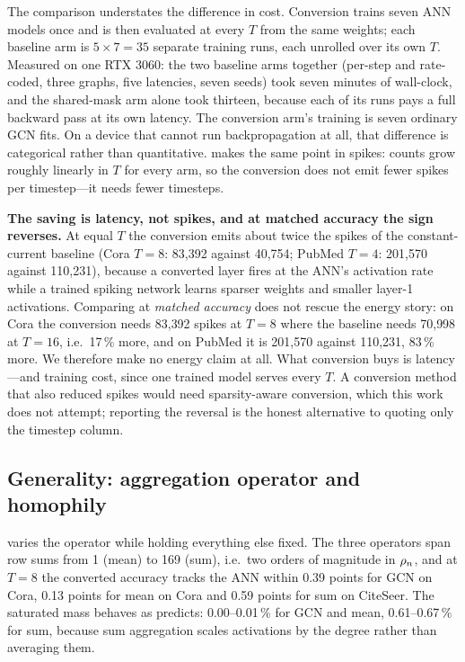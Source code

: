 The comparison understates the difference in cost. Conversion trains seven ANN models once and is
then evaluated at every $T$ from the same weights; each baseline arm is $5 \times 7 = 35$ separate
training runs, each unrolled over its own $T$. Measured on one RTX 3060: the two baseline arms
together (per-step and rate-coded, three graphs, five latencies, seven seeds) took seven minutes of
wall-clock, and the shared-mask arm alone took thirteen, because each of its runs pays a full
backward pass at its own latency. The conversion arm's training is seven ordinary GCN fits. On a
device that cannot run backpropagation at all, that difference is categorical rather than
quantitative.  makes the same point in spikes:
counts grow roughly linearly in $T$ for every arm, so the conversion does not emit fewer spikes per
timestep---it needs fewer timesteps.

\textbf{The saving is latency, not spikes, and at matched accuracy the sign reverses.} At equal
$T$ the conversion emits about twice the spikes of the constant-current baseline (Cora $T=8$:
83{,}392 against 40{,}754; PubMed $T=4$: 201{,}570 against 110{,}231), because a converted layer
fires at the ANN's activation rate while a trained spiking network learns sparser weights and
smaller layer-1 activations. Comparing at \emph{matched accuracy} does not rescue the energy
story: on Cora the conversion needs 83{,}392 spikes at $T=8$ where the baseline needs 70{,}998
at $T=16$, i.e.\ 17\,\% more, and on PubMed it is 201{,}570 against 110{,}231, 83\,\% more.
We therefore make no energy claim at all. What conversion buys is latency---and training cost,
since one trained model serves every $T$. A conversion method that also reduced spikes would
need sparsity-aware conversion, which this work does not attempt; reporting the reversal is the
honest alternative to quoting only the timestep column.

\subsection{Generality: aggregation operator and homophily}
\label{sec:generality}

 varies the operator while holding everything else fixed. The three operators span
row sums from 1 (mean) to 169 (sum), i.e.\ two orders of magnitude in $\rho_{n}$, and at $T=8$ the
converted accuracy tracks the ANN within 0.39 points for GCN on Cora, 0.13 points for mean on Cora
and 0.59 points for sum on CiteSeer. The saturated mass behaves as  predicts:
0.00--0.01\,\% for GCN and mean, 0.61--0.67\,\% for sum, because sum aggregation scales activations
by the degree rather than averaging them.

